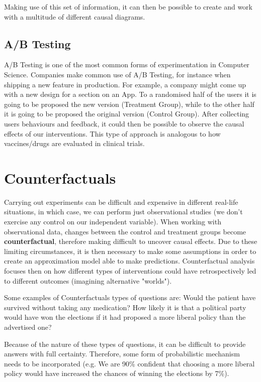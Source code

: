 Making use of this set of information, it can then be possible to create and work with a multitude of different causal diagrams.

\vspace{-0.2cm}
\subsection{A/B Testing}
\label{testing}
\vspace{-0.2cm}
A/B Testing is one of the most common forms of experimentation in Computer Science. Companies  make common use of A/B Testing, for instance when shipping a new feature in production. For example, a company might come up with a new design for a section on an App. To a randomised half of the users it is going to be proposed the new version (Treatment Group), while to the other half it is going to be proposed the original version (Control Group). After collecting users behaviours and feedback, it could then be possible to observe the causal effects of our interventions. This type of approach is analogous to how vaccines/drugs are evaluated in clinical trials.

\section{Counterfactuals}
Carrying out experiments can be difficult and expensive in different real-life situations, in which case, we can perform just observational studies (we don't exercise any control on our independent variable). When working with observational data, changes between the control and treatment groups become \textbf{counterfactual}, therefore making difficult to uncover causal effects. Due to these limiting circumstances, it is then necessary to make some assumptions in order to create an approximation model able to make predictions. Counterfactual analysis focuses then on how different types of interventions could have retrospectively led to different outcomes (imagining alternative "worlds"). 

Some examples of Counterfactuals types of questions are: Would the patient have survived without taking any medication? How likely it is that a political party would have won the elections if it had proposed a more liberal policy than the advertised one? 

Because of the nature of these types of questions, it can be difficult to provide answers with full certainty. Therefore, some form of probabilistic mechanism needs to be incorporated (e.g. We are 90\% confident that choosing a more liberal policy would have increased the chances of winning the elections by 7\%).

